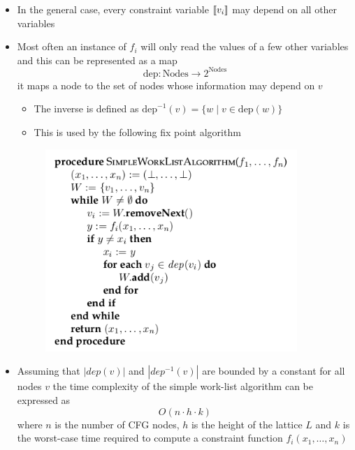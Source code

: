 \begin{itemize}
  \item In the general case, every constraint variable $\left\llbracket v_i\right\rrbracket$ may depend on all other variables
  \item Most often an instance of $f_i$ will only read the values of a few other variables and this can be represented as a map
  \begin{equation*}
    \text{dep} : \text{Nodes} \to 2^{\text{Nodes}}
  \end{equation*}
  it maps a node to the set of nodes whose information may depend on $v$
  \begin{itemize}
  	\item The inverse is defined as $\text{dep}^{-1}(v) = \{w \mid v \in \text{dep}(w)\}$
  	\item This is used by the following fix point algorithm
  \end{itemize}
  \begin{figure}[H]
  	\centering
  	\includegraphics[width=270pt]{img/monotone/simple_worklist}
  \end{figure}
	\item Assuming that $|dep(v)|$ and $|dep^{-1}(v)|$ are bounded by a constant for all nodes $v$ the time complexity of the simple work-list algorithm can be expressed as
  \begin{equation*}
    O(n \cdot h \cdot k)
  \end{equation*}
  where $n$ is the number of CFG nodes, $h$ is the height of the lattice $L$ and $k$ is the worst-case time required to compute a constraint function $f_i(x_1, \dots, x_n)$	
\end{itemize}

